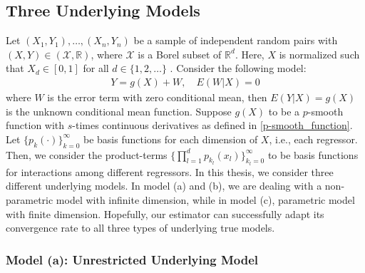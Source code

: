 \documentclass[12pt, a4paper]{article}
\theoremstyle{MAstyle} \newtheorem{assumption}{Assumption}[section]
\theoremstyle{MAstyle} \newtheorem{definition}{Definition}[section]
\theoremstyle{MAstyle} \newtheorem{theorem}{Theorem}[section]
\theoremstyle{MAstyle} \newtheorem{corollary}{Corollary}[section]
\begin{document}
            \subsection{Three Underlying Models}\label{underlying_models}
                Let $(X_1, Y_1), \ldots, (X_n,Y_n)$ be a sample of independent random pairs with $(X,Y) \in (\mathcal{X},\mathbb{R})$, where $\mathcal{X}$ is a Borel subset of $\mathbb{R}^d$. Here, $X$ is normalized such that $X_d \in [0,1]$ for all $d \in \{1,2,\ldots\}$ . Consider the following model:
                \begin{align}
                    Y=g(X)+W, \quad E(W|X)=0
                \end{align}
                where $W$ is the error term with zero conditional mean, then $E(Y|X)=g(X)$ is the unknown conditional mean function. Suppose $g(X)$ to be a $p$-smooth function with $s$-times continuous derivatives as defined in \ref{p-smooth_function}. \\

                Let $\{p_k(\cdot)\}_{k=0}^{\infty}$ be basis functions for each dimension of $X$, i.e., each regressor. Then, we consider the product-terms $\{\prod_{l=1}^{d}p_{k_l}(x_l)\}_{k_l=0}^{\infty}$ to be basis functions for interactions among different regressors. In this thesis, we consider three different underlying models. In model (a) and (b), we are dealing with a non-parametric model with infinite dimension, while in model (c), parametric model with finite dimension. Hopefully, our estimator can successfully adapt its convergence rate to all three types of underlying true models.

                \subsubsection{Model (a): Unrestricted Underlying Model}\label{unrestricted_model}
                
\end{document}
